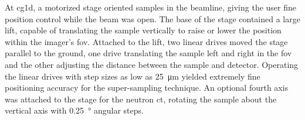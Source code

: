 \documentclass[../../../../main.tex]{subfiles}%
\begin{document}
%
    \Xsubsubsection%
    At \gls{cg1d}, a motorized stage oriented samples in the \gls{beamline}, giving the user fine position control while the beam was open.
    The base of the stage contained a large lift, capable of translating the sample vertically to raise or lower the position within the imager's \gls{fov}. 
    Attached to the lift, two linear drives moved the stage parallel to the ground, one drive translating the sample left and right in the \gls{fov} and the other adjusting the distance between the sample and detector.
    Operating the linear drives with step sizes as low as \SI{25}{\micro\meter} yielded extremely fine positioning accuracy for the \gls{super-sampling} technique.
    An optional fourth axis was attached to the stage for the neutron \gls{ct}, rotating the sample about the vertical axis with \SI{0.25}{\degree} angular steps.
\end{document}
